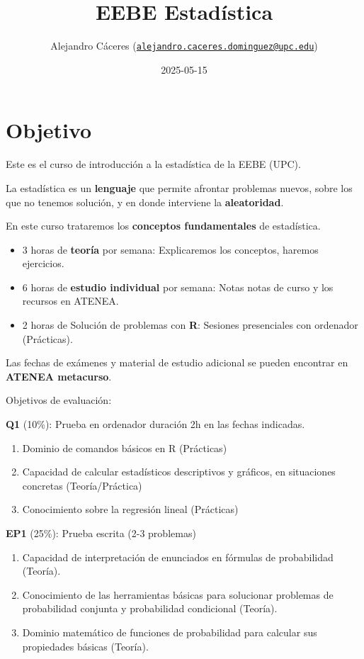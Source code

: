 \documentclass[
]{book}
\title{EEBE Estadística}
\author{Alejandro Cáceres (\href{mailto:alejandro.caceres.dominguez@upc.edu}{\nolinkurl{alejandro.caceres.dominguez@upc.edu}})}
\date{2025-05-15}
\providecommand{\tightlist}{%
  \setlength{\itemsep}{0pt}\setlength{\parskip}{0pt}}
\begin{document}
\maketitle

{
\setcounter{tocdepth}{1}
\tableofcontents
}
\hypertarget{objetivo}{%
\chapter{Objetivo}\label{objetivo}}

Este es el curso de introducción a la estadística de la EEBE (UPC).

La estadística es un \textbf{lenguaje} que permite afrontar problemas nuevos, sobre los que no tenemos solución, y en donde interviene la \textbf{aleatoridad}.

En este curso trataremos los \textbf{conceptos fundamentales} de estadística.

\begin{itemize}
\item
  3 horas de \textbf{teoría} por semana: Explicaremos los conceptos, haremos ejercicios.
\item
  6 horas de \textbf{estudio individual} por semana: Notas notas de curso y los recursos en ATENEA.
\item
  2 horas de Solución de problemas con \textbf{R}: Sesiones presenciales con ordenador (Prácticas).
\end{itemize}

Las fechas de exámenes y material de estudio adicional se pueden encontrar en \textbf{ATENEA metacurso}.

Objetivos de evaluación:

\textbf{Q1} (10\%): Prueba en ordenador duración 2h en las fechas indicadas.

\begin{enumerate}
\def\labelenumi{\alph{enumi}.}
\tightlist
\item
  Dominio de comandos básicos en R (Prácticas)
\item
  Capacidad de calcular estadísticos descriptivos y gráficos, en situaciones concretas (Teoría/Práctica)
\item
  Conocimiento sobre la regresión lineal (Prácticas)
\end{enumerate}

\textbf{EP1} (25\%): Prueba escrita (2-3 problemas)

\begin{enumerate}
\def\labelenumi{\alph{enumi}.}
\tightlist
\item
  Capacidad de interpretación de enunciados en fórmulas de probabilidad (Teoría).
\item
  Conocimiento de las herramientas básicas para solucionar problemas de probabilidad conjunta y probabilidad condicional (Teoría).
\item
  Dominio matemático de funciones de probabilidad para calcular sus propiedades básicas (Teoría).
\end{enumerate}
\end{document}
